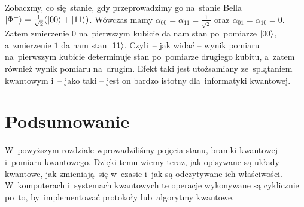 Zobaczmy, co się~stanie, gdy przeprowadzimy go na~stanie Bella
$\ket{\Phi^+}=\frac{1}{\sqrt{2}}(\ket{00}+\ket{11})$. Wówczas mamy
$\alpha_{00}=\alpha_{11}=\frac{1}{\sqrt{2}}$ oraz $\alpha_{01}=\alpha_{10}=0$. Zatem zmierzenie $0$
na~pierwszym kubicie da nam stan po~pomiarze $\ket{00}$, a~zmierzenie $1$ da nam
stan $\ket{11}$. Czyli~-- jak widać -- wynik pomiaru na~pierwszym kubicie determinuje
stan po~pomiarze drugiego kubitu, a~zatem również wynik pomiaru na~drugim. Efekt
taki jest utożsamiany ze~splątaniem kwantowym i~-- jako taki -- jest on bardzo istotny dla~informatyki kwantowej.

\section{Podsumowanie}
W~powyższym rozdziale wprowadziliśmy pojęcia stanu, bramki kwantowej i~pomiaru kwantowego. Dzięki temu wiemy teraz,
jak opisywane są układy kwantowe, jak zmieniają~się w~czasie i~jak są
odczytywane ich właściwości. W~komputerach i~systemach kwantowych te operacje wykonywane są
cyklicznie po~to, by~implementować protokoły lub~algorytmy kwantowe.

